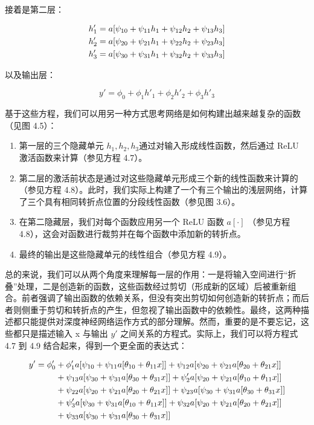 \documentclass[lang=cn,newtx,10pt,scheme=chinese]{elegantbook}
\begin{document}
接着是第二层：

\begin{align}
	h'_1 = a[\psi_{10} + \psi_{11}h_1 + \psi_{12}h_2 + \psi_{13}h_3] \notag \\
	h'_2 = a[\psi_{20} + \psi_{21}h_1 + \psi_{22}h_2 + \psi_{23}h_3] \notag \\
	h'_3 = a[\psi_{30} + \psi_{31}h_1 + \psi_{32}h_2 + \psi_{33}h_3] 
\end{align} 

以及输出层：

\begin{equation}
y' = \phi_0 + \phi_1h'_1 + \phi_2h'_2 + \phi_3h'_3 
\end{equation}

基于这些方程，我们可以用另一种方式思考网络是如何构建出越来越复杂的函数（见图 4.5）：

\begin{enumerate}
  \item 第一层的三个隐藏单元 \(h_1,h_2,h_3\)通过对输入形成线性函数，然后通过 ReLU 激活函数来计算（参见方程 4.7）。
  \item 第二层的激活前状态是通过对这些隐藏单元形成三个新的线性函数来计算的（参见方程 4.8）。此时，我们实际上构建了一个有三个输出的浅层网络，计算了三个具有相同转折点位置的分段线性函数（参见图 3.6）。 
  \item 在第二隐藏层，我们对每个函数应用另一个 ReLU 函数 \(a[\cdot]\) （参见方程 4.8），这会对函数进行裁剪并在每个函数中添加新的转折点。
  \item 最终的输出是这些隐藏单元的线性组合（参见方程 4.9）。
\end{enumerate}

总的来说，我们可以从两个角度来理解每一层的作用：一是将输入空间进行“折叠”处理，二是创造新的函数，这些函数经过剪切（形成新的区域）后被重新组合。前者强调了输出函数的依赖关系，但没有突出剪切如何创造新的转折点；而后者则侧重于剪切和转折点的产生，但忽视了输出函数中的依赖性。最终，这两种描述都只能提供对深度神经网络运作方式的部分理解。然而，重要的是不要忘记，这些都只是描述输入 x 与输出 \(y \prime\) 之间关系的方程式。实际上，我们可以将方程式 4.7 到 4.9 结合起来，得到一个更全面的表达式：

\begin{align}
	y' = \phi'_0 &+ \phi'_1 a[\psi_{10} + \psi_{11} a[\theta_{10} + \theta_{11} x]] + \psi_{12} a[\psi_{20} + \psi_{21} a[\theta_{20} + \theta_{21} x]] \notag \\
	&+ \psi_{13} a[\psi_{30} + \psi_{31} a[\theta_{30} + \theta_{31} x]] + \psi'_{2} a[\psi_{20} + \psi_{21} a[\theta_{10} + \theta_{11} x]] \notag \\
	&+ \psi_{22} a[\psi_{20} + \psi_{21} a[\theta_{20} + \theta_{21} x]] + \psi_{23} a[\psi_{30} + \psi_{31} a[\theta_{30} + \theta_{31} x]] \notag \\
	&+ \psi'_{3} a[\psi_{30} + \psi_{31} a[\theta_{10} + \theta_{11} x]] + \psi_{32} a[\psi_{20} + \psi_{21} a[\theta_{20} + \theta_{21} x]] \notag \\
	&+ \psi_{33} a[\psi_{30} + \psi_{31} a[\theta_{30} + \theta_{31} x]] 
\end{align} 
\end{document}
